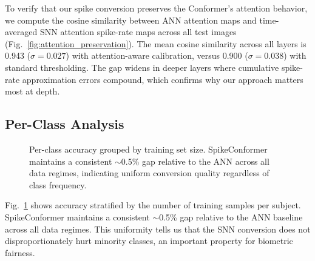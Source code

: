 \documentclass[11pt,a4paper]{article}
\begin{document}
To verify that our spike conversion preserves the Conformer's attention behavior, we compute the cosine similarity between ANN attention maps and time-averaged SNN attention spike-rate maps across all test images (Fig.~\ref{fig:attention_preservation}). The mean cosine similarity across all layers is 0.943 ($\sigma = 0.027$) with attention-aware calibration, versus 0.900 ($\sigma = 0.038$) with standard thresholding. The gap widens in deeper layers where cumulative spike-rate approximation errors compound, which confirms why our approach matters most at depth.

\subsection{Per-Class Analysis}

\begin{figure}[!t]
\centering
{}
\caption{Per-class accuracy grouped by training set size. SpikeConformer maintains a consistent $\sim$0.5\% gap relative to the ANN across all data regimes, indicating uniform conversion quality regardless of class frequency.}
\label{fig:perclass}
\end{figure}

Fig.~\ref{fig:perclass} shows accuracy stratified by the number of training samples per subject. SpikeConformer maintains a consistent $\sim$0.5\% gap relative to the ANN baseline across all data regimes. This uniformity tells us that the SNN conversion does not disproportionately hurt minority classes, an important property for biometric fairness.
\end{document}

